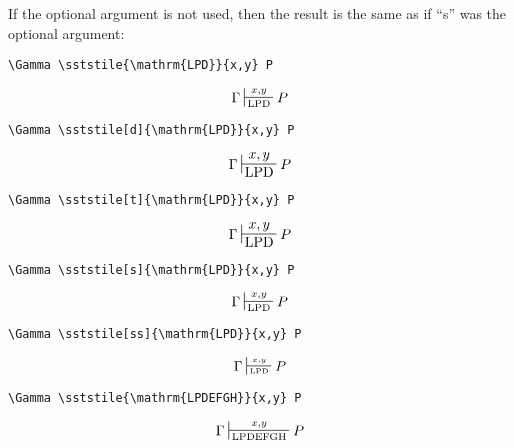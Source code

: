 \documentclass{pracjourn}
\begin{document}
If the optional argument is not used, then the result is the same as if ``s'' was the optional argument:

\begin{verbatim}
\Gamma \sststile{\mathrm{LPD}}{x,y} P
\end{verbatim}
\begin{equation}\Gamma \sststile{\mathrm{LPD}}{x,y} P\end{equation} \vspace{0.4em}

\begin{verbatim}
\Gamma \sststile[d]{\mathrm{LPD}}{x,y} P
\end{verbatim}
\begin{equation}\Gamma \sststile[t]{\mathrm{LPD}}{x,y} P\end{equation} \vspace{0.4em}

\begin{verbatim}
\Gamma \sststile[t]{\mathrm{LPD}}{x,y} P
\end{verbatim}
\begin{equation}\Gamma \sststile[d]{\mathrm{LPD}}{x,y} P\end{equation} \vspace{0.4em}

\begin{verbatim}
\Gamma \sststile[s]{\mathrm{LPD}}{x,y} P
\end{verbatim}
\begin{equation}\Gamma \sststile[s]{\mathrm{LPD}}{x,y} P\end{equation} \vspace{0.4em}
          
\pagebreak

\begin{verbatim}
\Gamma \sststile[ss]{\mathrm{LPD}}{x,y} P
\end{verbatim}
\begin{equation}\Gamma \sststile[ss]{\mathrm{LPD}}{x,y} P\end{equation} \vspace{0.4em}

\begin{verbatim}
\Gamma \sststile{\mathrm{LPDEFGH}}{x,y} P
\end{verbatim}
\begin{equation}\Gamma \sststile{\mathrm{LPDEFGH}}{x,y} P\end{equation} \vspace{0.4em}
\end{document}
